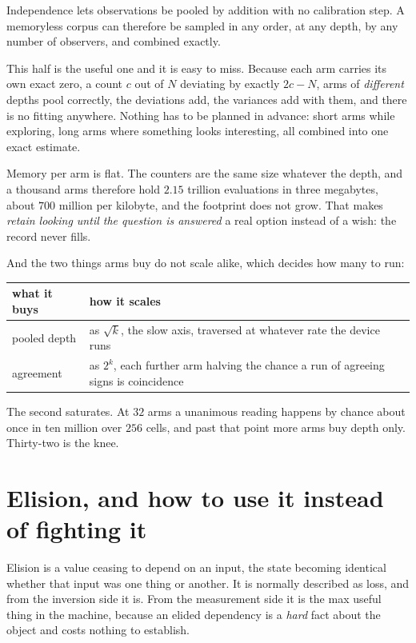 Independence lets observations be pooled by addition with no calibration step. A memoryless corpus can therefore be sampled in any order, at any depth, by any number of observers, and combined exactly.

This half is the useful one and it is easy to miss. Because each arm carries its own exact zero, a count \(c\) out of \(N\) deviating by exactly \(2c - N\), arms of \emph{different} depths pool correctly, the deviations add, the variances add with them, and there is no fitting anywhere. Nothing has to be planned in advance: short arms while exploring, long arms where something looks interesting, all combined into one exact estimate.

Memory per arm is flat. The counters are the same size whatever the depth, and a thousand arms therefore hold \(2.15\) trillion evaluations in three megabytes, about \(700\) million per kilobyte, and the footprint does not grow. That makes \emph{retain looking until the question is answered} a real option instead of a wish: the record never fills.

And the two things arms buy do not scale alike, which decides how many to run:

\begin{center}
\begin{tabular}{@{}ll@{}}
\toprule
what it buys & how it scales \\
\midrule
pooled depth & as \(\sqrt{k}\), the slow axis, traversed at whatever rate the device runs \\
agreement & as \(2^{k}\), each further arm halving the chance a run of agreeing signs is coincidence \\
\bottomrule
\end{tabular}
\end{center}

The second saturates. At \(32\) arms a unanimous reading happens by chance about once in ten million over \(256\) cells, and past that point more arms buy depth only. Thirty-two is the knee.

\section{Elision, and how to use it instead of fighting it}

Elision is a value ceasing to depend on an input, the state becoming identical whether that input was one thing or another. It is normally described as loss, and from the inversion side it is. From the measurement side it is the max useful thing in the machine, because an elided dependency is a \emph{hard} fact about the object and costs nothing to establish.

